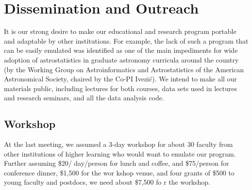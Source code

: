 \section{Dissemination and Outreach}
\label{sec:outreach}


It is our strong desire to make our educational and research
program portable and adaptable by other institutions. For example, 
the lack of such a program that can be easily emulated was identified 
as one of the main impediments for wide adoption of astrostatistics
in graduate astronomy curricula around the country (by the Working 
Group on Astroinformatics and Astrostatistics of the American Astronomical
Society, chaired by the Co-PI Ivezi\'{c}).  We intend to make all our
materials public, including lectures for
both courses, data sets used in lectures and research seminars, and
all the data analysis code. 


\subsection{Workshop} 
\label{sec:workshop}

At the last meeting, we assumed a 3-day workshop for about 30 faculty
from other institutions of higher learning who would want to emulate
our program. Further assuming \$20/ day/person for lunch and coffee,
and \$75/person for conference dinner, \$1,500 for the wor kshop
venue, and four grants of \$500 to young faculty and postdocs, we need
about \$7,500 fo r the workshop.
